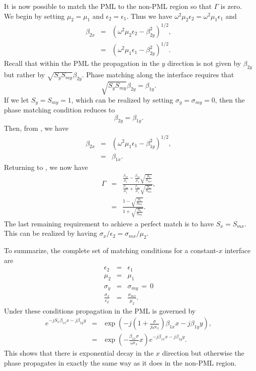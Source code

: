 It is now possible to match the PML to the non-PML region so that
$\Gamma$ is zero.  We begin by setting $\mu_2=\mu_1$ and
$\epsilon_2=\epsilon_1$.  Thus we have
$\omega^2\mu_2\epsilon_2=\omega^2\mu_1\epsilon_1$ and
\begin{eqnarray}
  \beta_{2x} &=& \left(\omega^2\mu_2\epsilon_2 - \beta_{2y}^2\right)^{1/2}, \\
         &=& \left(\omega^2\mu_1\epsilon_1 - \beta_{2y}^2\right)^{1/2}.
  \label{eq:k2xPml}
\end{eqnarray}
Recall that within the PML the propagation in the $y$ direction is not
given by $\beta_{2y}$ but rather by $\sqrt{S_y S_{my}}\beta_{2y}$.
Phase matching along the interface requires that
\begin{equation}
  \sqrt{S_y S_{my}}\beta_{2y} = \beta_{1y}.
\end{equation}
If we let $S_y = S_{my} = 1$, which can be realized by setting
$\sigma_y=\sigma_{my}=0$, then the phase matching condition reduces to
\begin{equation}
  \beta_{2y} = \beta_{1y}.
\end{equation}
Then, from , we have
\begin{eqnarray}
  \beta_{2x} &=& \left(\omega^2\mu_1\epsilon_1 - \beta_{1y}^2\right)^{1/2},\\
         &=&  \beta_{1x}.
\end{eqnarray}
Returning to , we now have 
\begin{eqnarray}
  \Gamma &=&  \frac{\frac{\beta_{1x}}{\mu_1} - \frac{\beta_{1x}}{\mu_1}
               \sqrt{\frac{S_x}{S_{mx}}}}
           {\frac{\beta_{1x}}{\mu_1} + \frac{\beta_{1x}}{\mu_1}
               \sqrt{\frac{S_x}{S_{mx}}}}, \\
   &=& \frac{1 - \sqrt{\frac{S_x}{S_{mx}}}}
            {1 + \sqrt{\frac{S_x}{S_{mx}}}}.
\end{eqnarray}
The last remaining requirement to achieve a perfect match is to have
$S_x=S_{mx}$.  This can be realized by having $\sigma_x/\epsilon_2 =
\sigma_{mx}/\mu_2$.  

To summarize, the complete set of matching
conditions for a constant-$x$ interface are
\begin{eqnarray}
  \epsilon_2 &=& \epsilon_1 \\
  \mu_2 &=& \mu_1 \\
  \sigma_y &=& \sigma_{my} \,=\, 0 \\
  \frac{\sigma_x}{\epsilon_2} &=& \frac{\sigma_{mx}}{\mu_2}.
\end{eqnarray}
Under these conditions propagation in the PML is governed by
\begin{eqnarray}
  e^{-j S_x \beta_{1x} x - j \beta_{1y} y} &=& 
  \exp\!\left(-j \left(1 + \frac{\sigma}{j\omega\epsilon_1}\right) \beta_{1x} x
   - j \beta_{1y} y\right), \\
 &=&  \exp\!\left(-\frac{\beta_{1x}\sigma}{\omega\epsilon_1}x\right)
  e^{-j\beta_{1x} x - j \beta_{1y} y}.
\end{eqnarray}
This shows that there is exponential decay in the $x$ direction but
otherwise the phase propagates in exactly the same way as it does in
the non-PML region.


